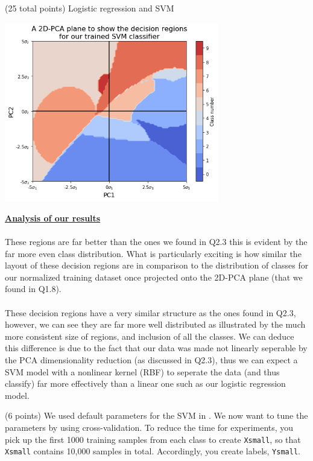 \documentclass[12pt]{article}
\begin{document}
\begin{question}{(25 total points) Logistic regression and SVM}
\begin{subquestion}
      \begin{answerbox}{35em}
        \begin{center}
         \includegraphics[width=0.7\textwidth]{images/q24.png}
        \end{center}
        \textbf{\footnotesize{\underline{Analysis of our results}}}\\
\\
        \scriptsize{
        These regions are far better than the ones we found in Q2.3 this is evident by the far more even class distribution. What is particularly exciting is how similar the layout of these decision regions are in comparison to the distribution of classes for our normalized training dataset once projected onto the 2D-PCA plane (that we found in Q1.8).\\
\\
        These decision regions have a very similar structure as the ones found in Q2.3, however, we can see they are far more well distributed as illustrated by the much more consistent size of regions, and inclusion of all the classes. We can deduce this difference is due to the fact that our data was made not linearly seperable by the PCA dimensionality reduction (as discussed in Q2.3), thus we can expect a SVM model with a nonlinear kernel (RBF) to seperate the data (and thus classify) far more effectively than a linear one such as our logistic regression model.
        }
      \end{answerbox}
  


   \end{subquestion}

   \begin{subquestion}{(6 points)
       We used default parameters for the SVM in .
       We now want to tune the parameters by using cross-validation.
       To reduce the time for experiments, you pick up the first 1000
       training samples from each class to create \texttt{Xsmall}, so that \texttt{Xsmall}
       contains 10,000 samples in total. Accordingly, you create
       labels, \texttt{Ysmall}.
     } \label{Q2.5}



\end{subquestion}
\end{question}
\end{document}
